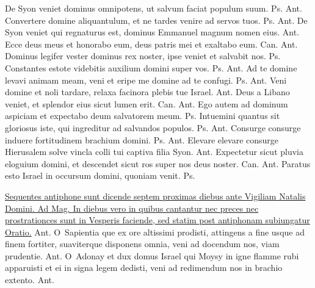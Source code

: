 \begin{multicols*}{2}
 De Syon veniet dominus omnipotens, ut salvum faciat populum suum. {\color{Red} Ps.}  {\color{Red} Ant.} Convertere domine aliquantulum, et ne tardes venire ad servos tuos. {\color{Red} Ps.}  {\color{Red} Ant.} De Syon veniet qui regnaturus est, dominus Emmanuel magnum nomen eius.  {\color{Red} Ant.} Ecce deus meus et honorabo eum, deus patris mei et exaltabo eum. {\color{Red} Can.}  {\color{Red} Ant.} Dominus legifer vester dominus rex noster, ipse veniet et salvabit nos. {\color{Red} Ps.} 
 Constantes estote videbitis auxilium domini super vos. {\color{Red} Ps.}  {\color{Red} Ant.} Ad te domine levavi animam meam, veni et eripe me domine ad te confugi. {\color{Red} Ps.}  {\color{Red} Ant.} Veni domine et noli tardare, relaxa facinora plebis tue Israel.  {\color{Red} Ant.} Deus a Libano veniet, et splendor eius sicut lumen erit. {\color{Red} Can.}  {\color{Red} Ant.} Ego autem ad dominum aspiciam et expectabo deum salvatorem meum. {\color{Red} Ps.} 
 Intuemini quantus sit gloriosus iste, qui ingreditur ad salvandos populos. {\color{Red} Ps.}  {\color{Red} Ant.} Consurge consurge induere fortitudinem brachium domini. {\color{Red} Ps.}  {\color{Red} Ant.} Elevare elevare consurge Hierusalem solve vincla colli tui captiva filia Syon.  {\color{Red} Ant.} Expectetur sicut pluvia eloguium domini, et descendet sicut ros super nos deus noster. {\color{Red} Can.}  {\color{Red} Ant.} Paratus esto Israel in occursum domini, quoniam venit. {\color{Red} Ps.} 
{\color{Red} }
\par \noindent \ul{Sequentes antiphone sunt dicende septem proximas diebus ante Vigiliam Natalis Domini. Ad Mag. In diebus vero in quibus cantantur nec preces nec prostrationces sunt in Vesperis faciende, sed statim post antiphonam subiungatur Oratio.} {\color{Red} Ant.}
\lettrine[lines=2]{\zallmancaps \color{Red} O}{}\ Sapientia que ex ore altissimi prodisti, attingens a fine usque ad finem fortiter, suaviterque disponens omnia, veni ad docendum nos, viam prudentie. {\color{Red} Ant.}
\lettrine[lines=2]{\zallmancaps \color{Blue} O}{}\ Adonay et dux domus Israel qui Moysy in igne flamme rubi apparuisti et ei in signa legem dedisti, veni ad redimendum nos in brachio extento. {\color{Red} Ant.}

\end{multicols*}
